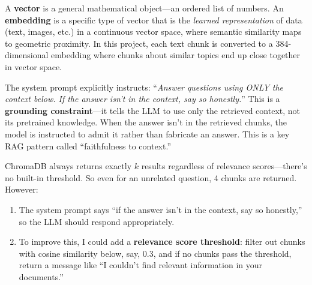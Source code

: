 \documentclass[12pt,a4paper]{article}
\begin{document}
\begin{interviewbox}
\end{interviewbox}
\begin{answerbox}
A \textbf{vector} is a general mathematical object—an ordered list of numbers. An \textbf{embedding} is a specific type of vector that is the \textit{learned representation} of data (text, images, etc.) in a continuous vector space, where semantic similarity maps to geometric proximity. In this project, each text chunk is converted to a 384-dimensional embedding where chunks about similar topics end up close together in vector space.
\end{answerbox}

\begin{interviewbox}
\end{interviewbox}
\begin{answerbox}
The system prompt explicitly instructs: ``\textit{Answer questions using ONLY the context below. If the answer isn't in the context, say so honestly.}'' This is a \textbf{grounding constraint}—it tells the LLM to use only the retrieved context, not its pretrained knowledge. When the answer isn't in the retrieved chunks, the model is instructed to admit it rather than fabricate an answer. This is a key RAG pattern called ``faithfulness to context.''
\end{answerbox}

\begin{interviewbox}
\end{interviewbox}
\begin{answerbox}
ChromaDB always returns exactly $k$ results regardless of relevance scores—there's no built-in threshold. So even for an unrelated question, 4 chunks are returned. However:
\begin{enumerate}
  \item The system prompt says ``if the answer isn't in the context, say so honestly,'' so the LLM should respond appropriately.
  \item To improve this, I could add a \textbf{relevance score threshold}: filter out chunks with cosine similarity below, say, 0.3, and if no chunks pass the threshold, return a message like ``I couldn't find relevant information in your documents.''
\end{enumerate}
\end{answerbox}
\end{document}
